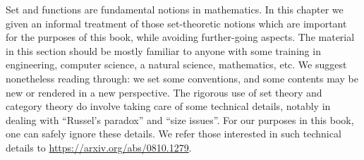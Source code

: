 


Set and functions are fundamental notions in mathematics. In this chapter we given an informal treatment of those set-theoretic notions which are important for the purposes of this book, while avoiding further-going aspects. The material in this section should be mostly familiar to anyone with some training in engineering, computer science, a natural science, mathematics, etc. We suggest nonetheless reading through: we set some conventions, and some contents may be new or rendered in a new perspective. The rigorous use of set theory and category theory do involve taking care of some technical details, notably in dealing with ``Russel's paradox'' and ``size issues''. For our purposes in this book, one can safely ignore these details. We refer those interested in such technical details to \url{https://arxiv.org/abs/0810.1279}.  


\label{ch:sets}







